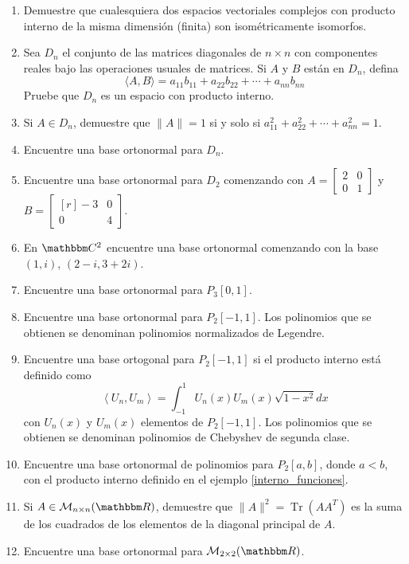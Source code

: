 \begin{enumerate}[start=62]
    \item Demuestre que cualesquiera dos espacios vectoriales complejos con producto interno de la misma dimensión (finita) son isométricamente isomorfos.
    \item Sea $D_{n}$ el conjunto de las matrices diagonales de $n \times n$ con componentes reales bajo las operaciones usuales de matrices. Si $A$ y $B$ están en $D_{n}$, defina
    $$\langle A, B \rangle = a_{11} b_{11}+a_{22} b_{22}+\cdots+a_{n n} b_{n n}$$
    Pruebe que $D_{n}$ es un espacio con producto interno.
    \item Si $A \in D_{n}$, demuestre que $\|A\|=1$ si y solo si $a_{11}^{2}+a_{22}^{2}+\cdots+a_{n n}^{2}=1$.
    \item Encuentre una base ortonormal para $D_{n}$.
    \item Encuentre una base ortonormal para $D_{2}$ comenzando con $A=\begin{bmatrix} 2 & 0 \\ 0 & 1 \end{bmatrix}$ y $B=\begin{bmatrix*}[r] -3 & 0 \\ 0 & 4 \end{bmatrix*}$.
    \item En $\CC[2]$ encuentre una base ortonormal comenzando con la base $(1, i)$, $(2-i, 3+2 i)$.
    \item Encuentre una base ortonormal para $P_{3}[0,1]$.
    \item Encuentre una base ortonormal para $P_{2}[-1,1]$. Los polinomios que se obtienen se denominan polinomios normalizados de Legendre.
    \item Encuentre una base ortogonal para $P_{2}[-1,1]$ si el producto interno está definido como
    $$\left\langle U_{n}, U_{m}\right\rangle = \int_{-1}^{1} U_{n}(x) U_{m}(x) \sqrt{1-x^{2}} d x$$
    con $U_{n}(x)$ y $U_{m}(x)$ elementos de $P_{2}[-1,1]$. Los polinomios que se obtienen se denominan polinomios de Chebyshev de segunda clase.
    \item Encuentre una base ortonormal de polinomios para $P_{2}[a, b]$, donde $a<b$, con el producto interno definido en el ejemplo \ref{interno_funciones}.
    \item Si $A \in \mathcal{M}_{n \times n}(\RR)$, demuestre que $\|A\|^{2}=\operatorname{Tr}\left(A A^{T}\right)$ es la suma de los cuadrados de los elementos de la diagonal principal de $A$.
    \item Encuentre una base ortonormal para $\mathcal{M}_{2 \times 2}(\RR)$.

\end{enumerate}
